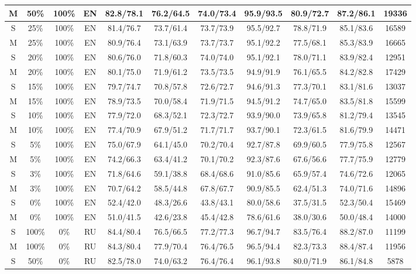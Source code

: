 \begin{table*}
{\begin{tabular}{|c|c|c|c||c|c|c|c|c|c||c|}
M & 50\% & 100\% & EN & 82.8/78.1 & 76.2/64.5 & 74.0/73.4 & 95.9/93.5 & 80.9/72.7 & 87.2/86.1 & 19336 \\ \hline
S & 25\% & 100\% & EN & 81.4/76.7 & 73.7/61.4 & 73.7/73.9 & 95.5/92.7 & 78.8/71.9 & 85.1/83.6 & 16589 \\
M & 25\% & 100\% & EN & 80.9/76.4 & 73.1/63.9 & 73.7/73.7 & 95.1/92.2 & 77.5/68.1 & 85.3/83.9 & 16665 \\ \hline
S & 20\% & 100\% & EN & 80.6/76.0 & 71.8/60.3 & 74.0/74.0 & 95.1/92.1 & 78.0/71.1 & 83.9/82.4 & 12951 \\
M & 20\% & 100\% & EN & 80.1/75.0 & 71.9/61.2 & 73.5/73.5 & 94.9/91.9 & 76.1/65.5 & 84.2/82.8 & 17429 \\ \hline
S & 15\% & 100\% & EN & 79.7/74.7 & 70.8/57.8 & 72.6/72.7 & 94.6/91.3 & 77.3/70.1 & 83.1/81.6 & 13037 \\
M & 15\% & 100\% & EN & 78.9/73.5 & 70.0/58.4 & 71.9/71.5 & 94.5/91.2 & 74.7/65.0 & 83.5/81.8 & 15599 \\ \hline
S & 10\% & 100\% & EN & 77.9/72.0 & 68.3/52.1 & 72.3/72.7 & 93.9/90.0 & 73.9/65.8 & 81.2/79.4 & 13545 \\
M & 10\% & 100\% & EN & 77.4/70.9 & 67.9/51.2 & 71.7/71.7 & 93.7/90.1 & 72.3/61.5 & 81.6/79.9 & 14471 \\ \hline
S & 5\% & 100\% & EN & 75.0/67.9 & 64.1/45.0 & 70.2/70.4 & 92.7/87.8 & 69.9/60.5 & 77.9/75.8 & 12567 \\
M & 5\% & 100\% & EN & 74.2/66.3 & 63.4/41.2 & 70.1/70.2 & 92.3/87.6 & 67.6/56.6 & 77.7/75.9 & 12779 \\ \hline
S & 3\% & 100\% & EN & 71.8/64.6 & 59.1/38.8 & 68.4/68.6 & 91.0/85.6 & 65.9/57.4 & 74.6/72.6 & 12065 \\
M & 3\% & 100\% & EN & 70.7/64.2 & 58.5/44.8 & 67.8/67.7 & 90.9/85.5 & 62.4/51.3 & 74.0/71.6 & 14896 \\ \hline
S & 0\% & 100\% & EN & 52.4/42.0 & 48.3/26.6 & 43.8/43.1 & 80.0/58.6 & 37.5/31.5 & 52.3/50.4 & 15469 \\
M & 0\% & 100\% & EN & 51.0/41.5 & 42.6/23.8 & 45.4/42.8 & 78.6/61.6 & 38.0/30.6 & 50.0/48.4 & 14000 \\ \hline
S & 100\% & 0\% & RU & 84.4/80.4 & 76.5/66.5 & 77.2/77.3 & 96.7/94.7 & 83.5/76.4 & 88.2/87.0 & 11199 \\
M & 100\% & 0\% & RU & 84.3/80.4 & 77.9/70.4 & 76.4/76.5 & 96.5/94.4 & 82.3/73.3 & 88.4/87.4 & 11956 \\ \hline
S & 50\% & 0\% & RU & 82.5/78.0 & 74.0/63.2 & 76.4/76.4 & 96.1/93.8 & 80.0/71.9 & 86.1/84.8 & 5878 \\

\end{tabular}}
\end{table*}
